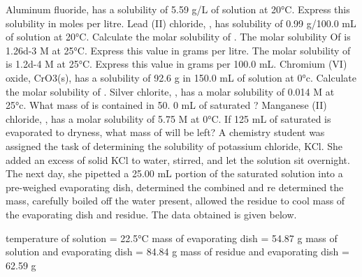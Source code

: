 \documentclass[fleqn]{exam}
\begin{document}
\begin{questions}
  \setcounter{question}{7}

  \question Aluminum fluoride,  has a solubility of 5.59 g/L of solution at 20°C. Express this solubility in moles per litre.
  \vspace{1.5in}
  \question Lead (II) chloride, , has solubility of 0.99 g/100.0 mL of solution at 20°C. Calculate the molar solubility of .
  \vspace{1.5in}
  \question The molar solubility Of  is \num{1.26d-3} M at 25°C. Express this value in grams per litre.
  \vspace{1.5in}
  \question The molar solubility of  is \num{1.2d-4} M at 25°C. Express this value in grams per 100.0 mL.
  \vspace{1.5in}
  \question Chromium (VI) oxide, CrO3(s), has a solubility of 92.6 g in 150.0 mL of solution at 0°c. Calculate the molar solubility of .
  \vspace{1.5in}
  \question Silver chlorite, , has a molar solubility of 0.014 M at 25°c. What mass of  is contained in 50. 0 mL of saturated ?
  \vspace{1.5in}
  \question Manganese (II) chloride, , has a molar solubility of 5.75 M at 0°C. If 125 mL of saturated  is evaporated to dryness, what mass of  will be left?
  \newpage
  \question A chemistry student was assigned the task of determining the solubility of potassium chloride, KCl. She added an excess of solid KCl to water, stirred, and let the solution sit overnight. The next day, she pipetted a 25.00 mL portion of the saturated solution into a pre-weighed evaporating dish, determined the combined and re determined the mass, carefully boiled off the water present, allowed the residue to cool mass of the evaporating dish and residue. The data obtained is given below.

  \begin{center}
    temperature of solution = 22.5°C \newline
    mass of evaporating dish = 54.87 g \newline
    mass of solution and evaporating dish = 84.84 g \newline
    mass of residue and evaporating dish = 62.59 g \newline
  \end{center}


\end{questions}
\end{document}
